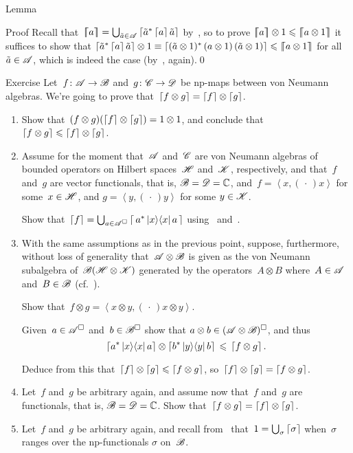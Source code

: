 \documentclass[a]{subfiles}
\begin{document}
\begin{parsec}
\begin{point}{Lemma}
\begin{point}{Proof}
Recall that~$\left\lceil\!\!\left\lceil a\right\rceil\!\!\right\rceil= \bigcup_{\tilde{a}\in\mathscr{A}}
\left\lceil\tilde{a}^* \left\lceil a\right\rceil\tilde{a}\right\rceil$
by~,
so to prove
$\cceil{a}\otimes 1 \leq \cceil{a\otimes 1}$
it suffices to show that
$\left\lceil\tilde{a}^* \left\lceil a\right\rceil\tilde{a}\right\rceil\otimes 1
\equiv \left\lceil(\tilde{a}\otimes 1)^*\, (a\otimes 1)
\,(\tilde{a}\otimes 1)\right\rceil
\leqslant  \left\lceil\!\!\left\lceil a\otimes 1\right\rceil\!\!\right\rceil$
for all~$\tilde{a}\in\mathscr{A}$,
which is indeed the case (by~, again).\qed
\end{point}
\end{point}
\begin{point}{Exercise}%
Let~$f\colon \mathscr{A}\to\mathscr{B}$
and~$g\colon \mathscr{C}\to\mathscr{D}$ be np-maps
between von Neumann algebras.
We're going to prove that~$\left\lceil f\otimes g\right\rceil
=\left\lceil f\right\rceil\otimes \left\lceil g\right\rceil$.
\begin{enumerate}
\item
Show that~$(f\otimes g)(\left\lceil f\right\rceil\otimes\left\lceil g\right\rceil)=1\otimes 1$,
and conclude that~$\left\lceil f\otimes g\right\rceil \leqslant\left\lceil f\right\rceil\otimes\left\lceil g\right\rceil$.
\item
Assume for the moment that~$\mathscr{A}$
and~$\mathscr{C}$ are von Neumann algebras
of bounded operators on Hilbert spaces~$\mathscr{H}$
and~$\mathscr{K}$, respectively,
and that~$f$ and~$g$ are vector functionals,
that is, $\mathscr{B}=\mathscr{D}=\mathbb{C}$,
and~$f=\left<x,(\,\cdot\,)x\right>$
for some~$x\in\mathscr{H}$,
and
$g=\left<y,(\,\cdot\,)y\right>$
for some
$y\in \mathscr{K}$.

Show that~$\left\lceil f\right\rceil=\bigcup_{a\in\mathscr{A}^\square}
\left\lceil\,a^* \left|x\right>\!\left<x\right| a\,\right\rceil$
using~
and~.

\item
With the same assumptions as in the previous
point,
suppose, furthermore, without loss of generality
that~$\mathscr{A}\otimes \mathscr{B}$
is
given as the von Neumann subalgebra of~$\mathscr{B}(\mathscr{H}\otimes \mathscr{K})$
generated by the operators~$A\otimes B$
where~$A\in\mathscr{A}$ and~$B\in\mathscr{B}$
(cf.~).

Show that~$f\otimes g = \left<x\otimes y,(\,\cdot\,)x\otimes y\right>$.

Given~$a\in\mathscr{A}^\square$ and~$b\in\mathscr{B}^\square$
show that $a\otimes b \in (\mathscr{A}\otimes \mathscr{B})^\square$,
and thus
\begin{equation*}
	\left\lceil a^* \left|x\right>\!\left<x\right|a\right\rceil\otimes
\left\lceil b^* \left|y\right>\!\left<y\right|b\right\rceil \,\leqslant\, \left\lceil f\otimes g\right\rceil.
\end{equation*}

Deduce from this that~$\left\lceil f\right\rceil\otimes \left\lceil g\right\rceil\leqslant \left\lceil f\otimes g\right\rceil$,
so~$\left\lceil f\right\rceil\otimes \left\lceil g\right\rceil= \left\lceil f\otimes g\right\rceil$.
\item
Let~$f$ and~$g$ be arbitrary again,
and assume now that~$f$ and~$g$ are functionals,
that is, $\mathscr{B}=\mathscr{D}=\mathbb{C}$.
Show that~$\left\lceil f\otimes g\right\rceil=\left\lceil f\right\rceil\otimes \left\lceil g\right\rceil$.
\item
Let~$f$ and~$g$ be arbitrary again,
and recall
from~
that~$1=\bigcup_{\sigma}\left\lceil\sigma\right\rceil$
when~$\sigma$ ranges over the np-functionals
$\sigma$ on~$\mathscr{B}$.


\end{enumerate}
\end{point}
\end{parsec}
\end{document}
